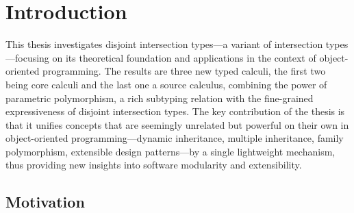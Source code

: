 
\chapter{Introduction}




This thesis investigates disjoint intersection types---a variant of intersection
types---focusing on its theoretical foundation and applications in the context
of object-oriented programming. The results are three new typed calculi, the
first two being core calculi and the last one a source calculus, combining the
power of parametric polymorphism, a rich subtyping relation with the
fine-grained expressiveness of disjoint intersection types. The key contribution
of the thesis is that it unifies concepts that are seemingly unrelated but
powerful on their own in object-oriented programming---dynamic inheritance,
multiple inheritance, family polymorphism, extensible design patterns---by a
single lightweight mechanism, thus providing new insights into software
modularity and extensibility.

\section{Motivation}

